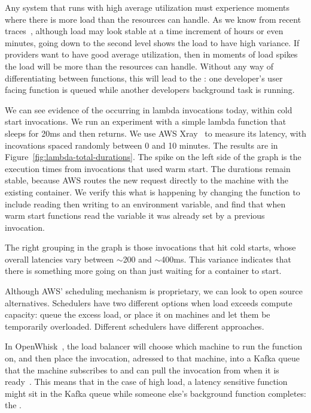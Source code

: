 Any system that runs with high average utilization must experience moments where
there is more load than the resources can handle. As we know from recent
traces~\cite{prequal}, although load may look stable at a time increment of
hours or even minutes, going down to the second level shows the load to have
high variance. If providers want to have good average utilization, then in
moments of load spikes the load will be more than the resources can handle.
Without any way of differentiating between functions, this will lead to the
\problem{}: one developer's user facing function is queued while another
developers background task is running.

We can see evidence of the \problem{} occurring in lambda invocations today,
within cold start invocations. We run an experiment with a simple lambda
function that sleeps for 20ms and then returns. We use AWS Xray~\cite{aws-xray}
to measure its latency, with incovations spaced randomly between 0 and 10
minutes. The results are in Figure~\ref{fig:lambda-total-durations}. The spike
on the left side of the graph is the execution times from invocations that used
warm start. The durations remain stable, because AWS routes the new request
directly to the machine with the existing container. We verify this what is
happening by changing the function to include reading then writing to an
environment variable, and find that when warm start functions read the variable
it was already set by a previous invocation.

The right grouping in the graph is those invocations that hit cold starts, whose
overall latencies vary between $\sim$200 and $\sim$400ms. This variance
indicates that there is something more going on than just waiting for a
container to start.

Although AWS' scheduling mechanism is proprietary, we can look to open source
alternatives. Schedulers have two different options when load exceeds compute
capacity: queue the excess load, or place it on machines and let them be
temporarily overloaded. Different schedulers have different approaches. 

In OpenWhisk~\cite{openwhisk}, the load balancer will choose which machine to
run the function on, and then place the invocation, adressed to that machine,
into a Kafka queue that the machine subscribes to and can pull the invocation
from when it is ready~\cite{openwhisk-sched}. This means that in the case of
high load, a latency sensitive function might sit in the Kafka queue while
someone else's background function completes: the \problem{}. 

